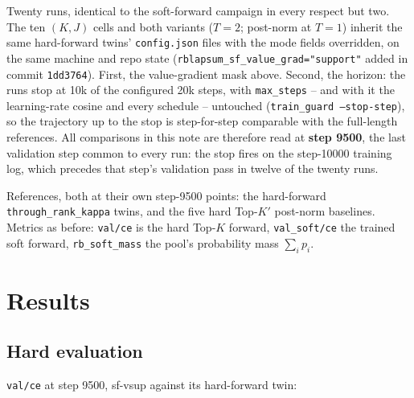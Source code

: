 \documentclass[11pt,a4paper]{article}
\newcommand{\code}[1]{\texttt{#1}}
\newcommand{\Kp}{K'}
\begin{document}
Twenty runs, identical to the soft-forward campaign in every respect but two.
The ten $(K,J)$ cells and both variants ($T=2$; post-norm at $T=1$) inherit
the same hard-forward twins' \code{config.json} files with the mode fields
overridden, on the same machine and repo state
(\code{rblapsum\_sf\_value\_grad="support"} added in commit \code{1dd3764}).
First, the value-gradient mask above. Second, the horizon: the runs stop at
10k of the configured 20k steps, with \code{max\_steps} -- and with it the
learning-rate cosine and every schedule -- untouched
(\code{train\_guard --stop-step}), so the trajectory up to the stop is
step-for-step comparable with the full-length references. All comparisons in
this note are therefore read at \textbf{step 9500}, the last validation step
common to every run: the stop fires on the step-10000 training log, which
precedes that step's validation pass in twelve of the twenty runs.

References, both at their own step-9500 points: the hard-forward
\code{through\_rank\_kappa} twins, and the five hard Top-$\Kp$ post-norm
baselines. Metrics as before: \code{val/ce} is the hard Top-$K$ forward,
\code{val\_soft/ce} the trained soft forward, \code{rb\_soft\_mass} the
pool's probability mass $\sum_i p_i$.

\section{Results}

\subsection*{Hard evaluation}

\code{val/ce} at step 9500, sf-vsup against its hard-forward twin:
\end{document}
